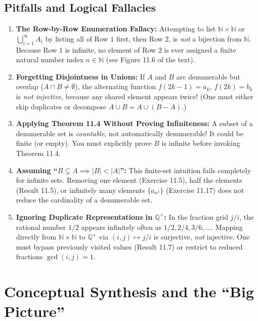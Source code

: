 \documentclass[11pt, letterpaper]{article}
\theoremstyle{definition}
\theoremstyle{remark}
\begin{document}
\subsection{Pitfalls and Logical Fallacies}

\begin{enumerate}[label=\textbf{\arabic*.}]
    \item \textbf{The Row-by-Row Enumeration Fallacy:} Attempting to list $\mathbb{N} \times \mathbb{N}$ or $\bigcup_{i=1}^{\infty} A_i$ by listing all of Row $1$ first, then Row $2$, is \emph{not} a bijection from $\mathbb{N}$. Because Row $1$ is infinite, no element of Row $2$ is ever assigned a finite natural number index $n \in \mathbb{N}$ (see Figure 11.6 of the text).
    \item \textbf{Forgetting Disjointness in Unions:} If $A$ and $B$ are denumerable but overlap ($A \cap B \neq \emptyset$), the alternating function $f(2k-1) = a_k$, $f(2k) = b_k$ is \emph{not injective}, because any shared element appears twice! (One must either skip duplicates or decompose $A \cup B = A \cup (B - A)$.)
    \item \textbf{Applying Theorem 11.4 Without Proving Infiniteness:} A subset of a denumerable set is \emph{countable}, not automatically denumerable! It could be finite (or empty). You must explicitly prove $B$ is infinite before invoking Theorem 11.4.
    \item \textbf{Assuming ``$B \subsetneq A \implies |B| < |A|$'':} This finite-set intuition fails completely for infinite sets. Removing one element (Exercise 11.5), half the elements (Result 11.5), or infinitely many elements $\{a_{n^2}\}$ (Exercise 11.17) does not reduce the cardinality of a denumerable set.
    \item \textbf{Ignoring Duplicate Representations in $\mathbb{Q}^+$:} In the fraction grid $j/i$, the rational number $1/2$ appears infinitely often as $1/2, 2/4, 3/6, \dots$. Mapping directly from $\mathbb{N} \times \mathbb{N}$ to $\mathbb{Q}^+$ via $(i, j) \mapsto j/i$ is surjective, \emph{not} injective. One must bypass previously visited values (Result 11.7) or restrict to reduced fractions $\gcd(i, j) = 1$.
\end{enumerate}

\section{Conceptual Synthesis and the ``Big Picture''}
\end{document}
